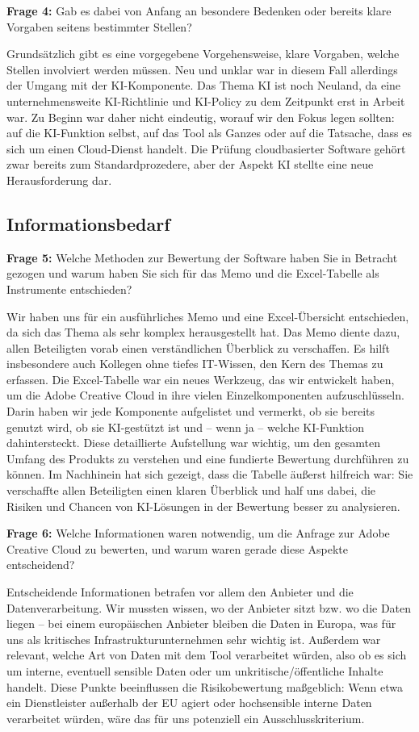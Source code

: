 \documentclass[
    12pt, 
    a4paper,
    ]{scrartcl} %
\begin{document}
\textbf{Frage 4:} Gab es dabei von Anfang an besondere Bedenken oder bereits klare Vorgaben seitens bestimmter Stellen?  

Grundsätzlich gibt es eine vorgegebene Vorgehensweise, klare Vorgaben, welche Stellen involviert werden müssen. Neu und unklar war in diesem Fall allerdings der Umgang mit der KI-Komponente. Das Thema KI ist noch Neuland, da eine unternehmensweite KI-Richtlinie und KI-Policy zu dem Zeitpunkt erst in Arbeit war. Zu Beginn war daher nicht eindeutig, worauf wir den Fokus legen sollten: auf die KI-Funktion selbst, auf das Tool als Ganzes oder auf die Tatsache, dass es sich um einen Cloud-Dienst handelt. Die Prüfung cloudbasierter Software gehört zwar bereits zum Standardprozedere, aber der Aspekt KI stellte eine neue Herausforderung dar.  

\subsection*{Informationsbedarf}

\textbf{Frage 5:} Welche Methoden zur Bewertung der Software haben Sie in Betracht gezogen und warum haben Sie sich für das Memo und die Excel-Tabelle als Instrumente entschieden?  

Wir haben uns für ein ausführliches Memo und eine Excel-Übersicht entschieden, da sich das Thema als sehr komplex herausgestellt hat. Das Memo diente dazu, allen Beteiligten vorab einen verständlichen Überblick zu verschaffen. Es hilft insbesondere auch Kollegen ohne tiefes IT-Wissen, den Kern des Themas zu erfassen. Die Excel-Tabelle war ein neues Werkzeug, das wir entwickelt haben, um die Adobe Creative Cloud in ihre vielen Einzelkomponenten aufzuschlüsseln. Darin haben wir jede Komponente aufgelistet und vermerkt, ob sie bereits genutzt wird, ob sie KI-gestützt ist und – wenn ja – welche KI-Funktion dahintersteckt. Diese detaillierte Aufstellung war wichtig, um den gesamten Umfang des Produkts zu verstehen und eine fundierte Bewertung durchführen zu können. Im Nachhinein hat sich gezeigt, dass die Tabelle äußerst hilfreich war: Sie verschaffte allen Beteiligten einen klaren Überblick und half uns dabei, die Risiken und Chancen von KI-Lösungen in der Bewertung besser zu analysieren.  

\textbf{Frage 6:} Welche Informationen waren notwendig, um die Anfrage zur Adobe Creative Cloud zu bewerten, und warum waren gerade diese Aspekte entscheidend?  

Entscheidende Informationen betrafen vor allem den Anbieter und die Datenverarbeitung. Wir mussten wissen, wo der Anbieter sitzt bzw. wo die Daten liegen – bei einem europäischen Anbieter bleiben die Daten in Europa, was für uns als kritisches Infrastrukturunternehmen sehr wichtig ist. Außerdem war relevant, welche Art von Daten mit dem Tool verarbeitet würden, also ob es sich um interne, eventuell sensible Daten oder um unkritische/öffentliche Inhalte handelt. Diese Punkte beeinflussen die Risikobewertung maßgeblich: Wenn etwa ein Dienstleister außerhalb der EU agiert oder hochsensible interne Daten verarbeitet würden, wäre das für uns potenziell ein Ausschlusskriterium.  
\end{document}
